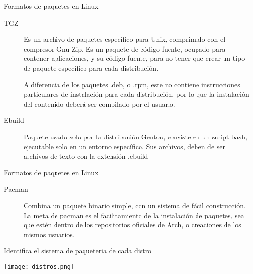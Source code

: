 \begin{frame}[c]{Formatos de paquetes en Linux}
  \begin{description}
    \item [TGZ] Es un archivo de paquetes específico para Unix, comprimido
      con el compresor Gnu Zip. Es un paquete de código fuente, ocupado para
      contener aplicaciones, y su código fuente, para no tener que crear un
      tipo de paquete específico para cada distribución.

      A diferencia de los
      paquetes .deb, o .rpm, este no contiene instrucciones particulares de
      instalación para cada distribución, por lo que la instalación del
      contenido deberá ser compilado por el usuario.

    \pausa
    \item [Ebuild] Paquete usado solo por la distribución Gentoo, consiste en
      un script bash, ejecutable solo en un entorno específico. Sus archivos,
      deben de ser archivos de texto con la extensión .ebuild
  \end{description}
\end{frame}

\begin{frame}[c]{Formatos de paquetes en Linux}
  \begin{description}
    \item [Pacman] Combina un paquete binario simple, con un sistema de fácil
      construcción. La meta de pacman es el facilitamiento de la instalación
      de paquetes, sea que estén dentro de los repositorios oficiales de Arch,
      o creaciones de los mismos usuarios.
  \end{description}
\end{frame}

\begin{frame}[c]{Identifica el sistema de paqueteria de cada distro}
  \begin{center}
    \texttt{[image: distros.png]}
  \end{center}
\end{frame}
